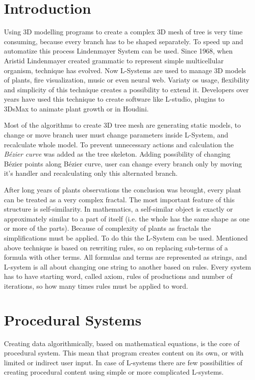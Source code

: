 \documentclass[b5paper,twoside,11pt]{article}
\begin{document}
\section{Introduction}
Using 3D modelling programs to create a complex 3D mesh of tree is very time consuming, because every branch has to be shaped separately.
To speed up and automatize this process Lindenmayer System can be used. Since 1968, when Aristid Lindenmayer created  grammatic to represent simple multicellular organism, technique has evolved. Now L-Systems are used to manage 3D models of plants\cite{Herbaceus, WebTree, Spray, wlosy, EnviroTree}, fire visualization\cite{Sim}, music\cite{MLSystem} or even neural web\cite{LBrain}. Variaty os usage, flexibility and simplicity of this technique creates a possibility to extend it. Developers over years have used this technique to create software like L-studio\cite{L-Studio}, plugins to 3DsMax to animate plant growth\cite{ABartniak} or in Houdini\cite{LHoud}. \par Most of the algorithms to create 3D tree mesh are generating static models, to change or move branch user must change parameters inside L-System, and recalculate whole model. To prevent unnecessary actions and calculation the \textit{Bézier curve} was added as the tree skeleton. Adding possibility of changing Bézier points along Bézier curve, user can change every branch only by moving it's handler and recalculating only this alternated branch.
\par After long years of plants observations the conclusion was brought, every plant can be treated as a very complex fractal. The most important feature of this structure is self-similarity. In mathematics, a self-similar object is exactly or approximately similar to a part of itself (i.e. the whole has the same shape as one or more of the parts)\cite{SelfSimi}. Because of complexity of plants as fractals the simplifications must be applied. To do this the L-System can be used.
Mentioned above technique is based on rewriting rules, so on replacing sub-terms of a formula with other terms. All formulas and terms are represented as strings, and L-system is all about changing one string to another based on rules. Every system has to have starting word, called axiom, rules of productions and number of iterations, so how many times rules must be applied to word. 

\section{Procedural Systems}
Creating data algorithmically, based on mathematical equations, is the core of procedural system.  This mean that program creates content on its own, or with limited or indirect user input. In case of L-systems there are few possibilities of creating procedural content using simple or more complicated L-systems.
\end{document}
